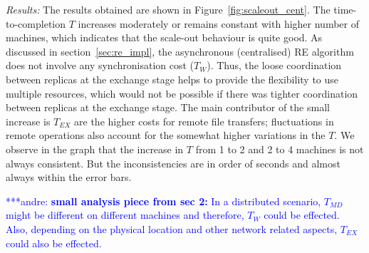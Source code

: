\documentclass{rspublic}
\newcommand{\jhanote}[1]{ {\textcolor{red} { ***shantenu: #1 }}}
\newcommand{\alnote}[1]{ {\textcolor{blue} { ***andre: #1 }}}
\newcommand{\alnote}[1]{}
\newcommand{\jhanote}[1]{}
\begin{document}
{\it Results:} The results obtained are shown in
Figure~\ref{fig:scaleout_cent}.  The time-to-completion $T$ increases
moderately or remains constant with higher number of machines, which
indicates that the scale-out behaviour is quite good.  As discussed in
section~\ref{sec:re_impl}, the asynchronous (centralised) RE algorithm
does not involve any synchronisation cost ($T_W$). 
Thus, the loose coordination between replicas at the exchange stage helps to 
provide the flexibility to use multiple resources, which would not be possible if
there was tighter coordination between replicas at the exchange stage.
The main contributor of the small increase is $T_{EX}$ are the higher
costs for remote file transfers; fluctuations in remote operations also account for the somewhat higher
variations in the $T$. We observe in the graph that the increase in $T$ from 1 to 2 and 2 to 4 machines is not always consistent. But the inconsistencies are in order of seconds and almost always within the error bars. 

\alnote{\textbf{small analysis piece from sec 2:}
In a distributed scenario, $T_{MD}$ might be different on 
different machines and therefore, $T_W$ could be effected. 
Also, depending on the physical location and other network 
related aspects, $T_{EX}$ could also be effected. }






\end{document}
